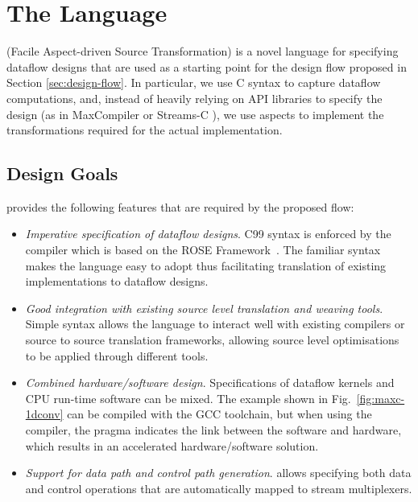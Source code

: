 \chapter{The \FAST{} Language}
\label{sec:fast}

\FAST{} (Facile Aspect-driven Source Transformation) is a novel
language for specifying dataflow designs that are used as a starting
point for the design flow proposed in Section
\ref{sec:design-flow}. In particular, we use C syntax to capture
dataflow computations, and, instead of heavily relying on API libraries
to specify the design (as in MaxCompiler \cite{5719584} or Streams-C
\cite{Gokhale:Stone:Arnold:Kalinowski:2000}), we use aspects to
implement the transformations required for the actual implementation.

\section{Design Goals}

\FAST{} provides the following features that are
required by the proposed flow:

\begin{itemize}
\item \emph{Imperative specification of dataflow designs}. C99 syntax
  is enforced by the \FAST{} compiler which is based on the ROSE
  Framework~\cite{Quinlan:2000}. The familiar syntax makes the
  language easy to adopt thus facilitating translation of existing
  implementations to dataflow designs.
\item \emph{Good integration with existing source level translation and
    weaving tools}. Simple syntax allows the language to interact well
  with existing compilers or source to source translation frameworks,
  allowing source level optimisations to be applied through different
  tools.
\item \emph{Combined hardware/software design}. Specifications of dataflow
  kernels and CPU run-time software can be mixed. The example shown in
  Fig.~\ref{fig:maxc-1dconv} can be compiled with the GCC toolchain,
  but when using the \FAST{} compiler, the pragma indicates the link
  between the software and hardware, which results in an accelerated
  hardware/software solution.
\item \emph{Support for data path and control path generation}. \FAST{}
  allows specifying both data and control operations that are
  automatically mapped to stream multiplexers.
\end{itemize}

